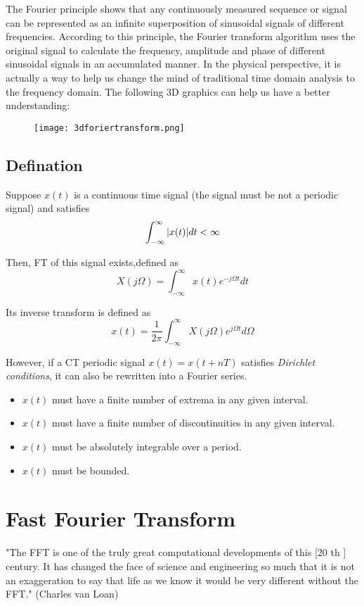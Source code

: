 \documentclass[12pt,a4paper]{article}
\begin{document}
The Fourier principle shows that any continuously measured sequence or signal can be represented as an infinite superposition of sinusoidal signals of different frequencies. According to this principle, the Fourier transform algorithm  uses the original signal to calculate the frequency, amplitude and phase of different sinusoidal signals in an accumulated manner. 
In the physical perspective, it is actually a way to help us change the mind of traditional time domain analysis to the frequency domain. The following 3D graphics can help us have a better understanding:

\begin{figure}[htbp]
\begin{center}
\texttt{[image: 3dforiertransform.png]} 
\end{center}
\end{figure}

\subsection{Defination}
Suppose $x(t)$ is a continuous time signal (the signal must be not a periodic signal) and satisfies
$$ \int_{-\infty}^{\infty} \abs{x(t)}dt < \infty $$

Then, FT of this signal exists,defined as
$$X(j\Omega)=\int_{-\infty}^{\infty} x(t)e^{-j\Omega t} dt$$

Its inverse transform is defined as
$$x(t)=\dfrac{1}{2 \pi} \int_{-\infty}^{\infty} X(j\Omega) e^{j\Omega t} d\Omega$$

However, if a CT periodic signal $x(t)=x(t+nT)$ satisfies \textit{Dirichlet conditions}, it can also be rewritten into a Fourier series. 
\begin{itemize}
\item $x(t)$ must have a finite number of extrema in any given interval.
\item $x(t)$ must have a finite number of discontinuities in any given interval.
\item $x(t)$ must be absolutely integrable over a period.
\item $x(t)$ must be bounded.
\end{itemize}

\section{Fast Fourier Transform}
"The FFT is one of the truly great computational
developments of this [20 th ] century. It has changed
the face of science and engineering so much that it
is not an exaggeration to say that life as we know it
would be very different without the FFT." (Charles van Loan)
\end{document}

